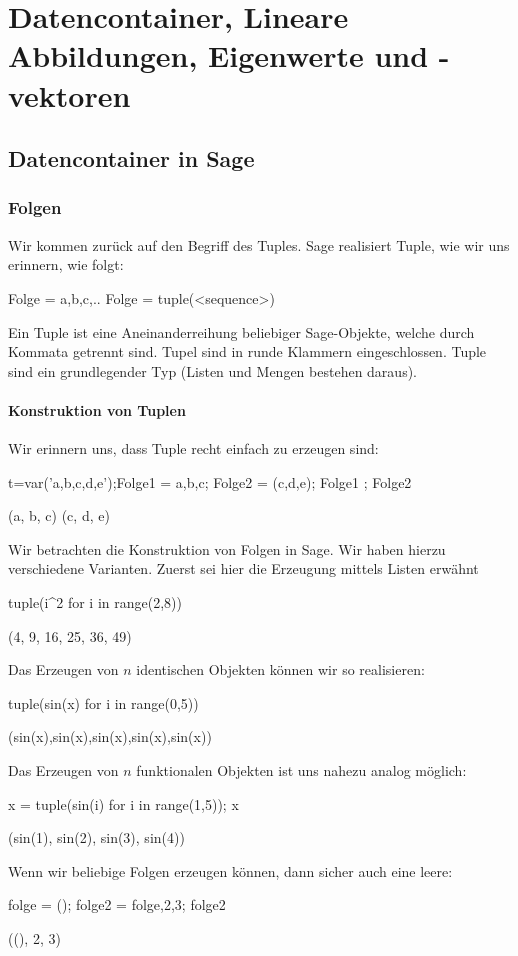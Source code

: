 \documentclass[fontsize=12pt,paper=a4,twoside,bibtotoc,idxtotoc,
liststotoc,pagesize,BCOR1.2cm,DIV15,chapterprefix,pagesize=pdftex]{scrbook}
\theoremstyle{plain}
\theoremstyle{definition}
\theoremstyle{remark}
\begin{document}
\chapter{Datencontainer, Lineare Abbildungen, Eigenwerte und -vektoren}
\section{Datencontainer in Sage}
\subsection{Folgen}
Wir kommen zurück auf den Begriff des Tuples. Sage realisiert Tuple, wie wir uns erinnern, wie folgt:
\begin{sagein}
 Folge = a,b,c,..
 Folge = tuple(<sequence>)
\end{sagein}
Ein Tuple ist eine Aneinanderreihung beliebiger Sage-Objekte, welche durch Kommata getrennt sind. Tupel sind in  runde Klammern eingeschlossen. Tuple sind ein 
grundlegender Typ (Listen und Mengen bestehen daraus). 
\subsubsection{Konstruktion von Tuplen}
Wir erinnern uns, dass Tuple recht einfach zu erzeugen sind:
\begin{sagein}
t=var('a,b,c,d,e');Folge1 = a,b,c; Folge2 = (c,d,e); Folge1 ; Folge2
\end{sagein}
\begin{sage}
(a, b, c)
(c, d, e)
\end{sage}
 Wir betrachten die Konstruktion von Folgen in Sage. Wir haben hierzu verschiedene Varianten. Zuerst sei hier die Erzeugung mittels Listen erwähnt
\begin{sagein}
tuple(i^2 for i in range(2,8))
\end{sagein}
\begin{sage}
(4, 9, 16, 25, 36, 49)
\end{sage}
Das Erzeugen von $n$ identischen Objekten können wir so realisieren:
\begin{sagein}
tuple(sin(x) for i in range(0,5))
\end{sagein}
\begin{sage}
  (sin(x),sin(x),sin(x),sin(x),sin(x))
\end{sage}
Das Erzeugen von $n$ funktionalen Objekten ist uns nahezu analog möglich:
\begin{sagein}
x = tuple(sin(i) for i in range(1,5)); x
\end{sagein}
\begin{sage}
(sin(1), sin(2), sin(3), sin(4))
\end{sage}  
Wenn wir beliebige Folgen erzeugen können, dann sicher auch eine leere:
\begin{sagein}
folge = (); folge2 = folge,2,3; folge2
\end{sagein}
\begin{sage}
 ((), 2, 3)
\end{sage}
\end{document}
